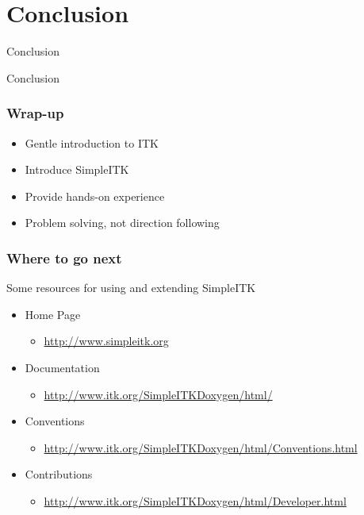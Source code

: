 \section{Conclusion}

\begin{frame}{Conclusion}
\fontsize{36pt}{36pt}\selectfont
\center
\begin{center}
Conclusion
\end{center}
\end{frame}

\begin{frame}
\frametitle{Wrap-up}
\begin{itemize}
  \item Gentle introduction to ITK
  \item Introduce SimpleITK
  \item Provide hands-on experience
  \item Problem solving, not direction following
\end{itemize}
\end{frame}

\begin{frame}
\frametitle{Where to go next}
Some resources for using and extending SimpleITK
\small
\begin{itemize}
  \item Home Page
  	\begin{itemize} \item \url{http://www.simpleitk.org} \end{itemize}
  \item Documentation
  	\begin{itemize} \item \url{http://www.itk.org/SimpleITKDoxygen/html/} \end{itemize}
  \item Conventions
  	\begin{itemize} \item \url{http://www.itk.org/SimpleITKDoxygen/html/Conventions.html} \end{itemize}
  \item Contributions
  	\begin{itemize} \item \url{http://www.itk.org/SimpleITKDoxygen/html/Developer.html} \end{itemize}
\end{itemize}
\normalsize
\end{frame}
